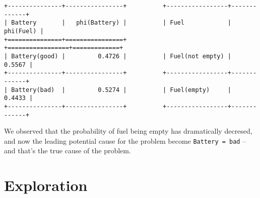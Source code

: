 \documentclass[11pt]{article}
\newcommand{\ilc}{\texttt}
\begin{document}
\begin{lstlisting}
+---------------+----------------+          +-----------------+-------------+
| Battery       |   phi(Battery) |          | Fuel            |   phi(Fuel) |
+===============+================+          +=================+=============+
| Battery(good) |         0.4726 |          | Fuel(not empty) |      0.5567 |
+---------------+----------------+          +-----------------+-------------+
| Battery(bad)  |         0.5274 |          | Fuel(empty)     |      0.4433 |
+---------------+----------------+          +-----------------+-------------+
\end{lstlisting}

We observed that the probability of fuel being empty has dramatically decresed, and now the leading potential cause for the problem become \ilc{Battery = bad} -- and that's the true cause of the problem.

\section*{Exploration}
\end{document}
